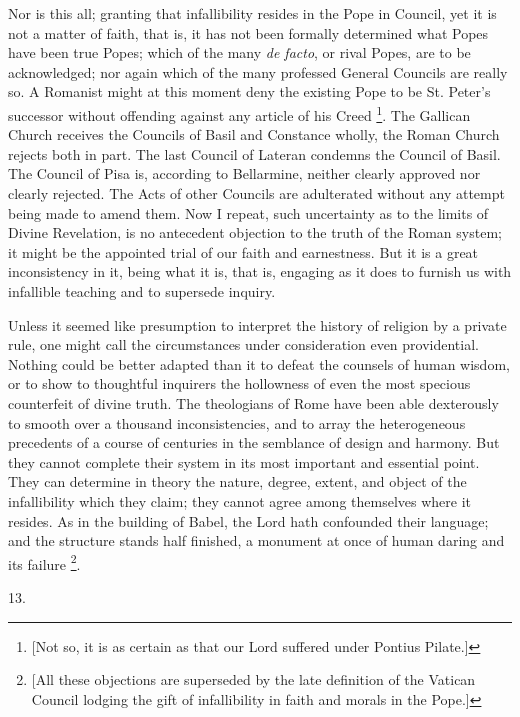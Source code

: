 Nor is this all; granting that infallibility resides in the Pope in
Council, yet it is not a matter of faith, that is, it has not
been formally determined what Popes have been true Popes; which of the
many \emph{de facto}, or rival Popes, are to be acknowledged; nor
again which of the many professed General Councils are really so. A
Romanist might at this moment deny the existing Pope to be St. Peter's
successor without offending against any article of his Creed \footnote{[Not so, it is as certain as that our Lord
suffered under Pontius Pilate.]}. The Gallican Church receives the Councils of Basil and
Constance wholly, the Roman Church rejects both in part. The last
Council of Lateran condemns the Council of Basil. The Council of Pisa
is, according to Bellarmine, neither clearly approved nor clearly
rejected. The Acts of other Councils are adulterated without any
attempt being made to amend them. Now I repeat, such uncertainty as to
the limits of Divine Revelation, is no antecedent objection to the
truth of the Roman system; it might be the appointed trial of our
faith and earnestness. But it is a great inconsistency in it, being
what it is, that is, engaging as it does to furnish us with infallible
teaching and to supersede inquiry.

Unless it seemed like presumption to interpret the history of
religion by a private rule, one might call the circumstances under
consideration even providential. Nothing could be better adapted than
it to defeat the counsels of human wisdom, or to show to thoughtful
inquirers the hollowness of even the most specious counterfeit of
divine truth. The theologians of Rome have been able dexterously to
smooth over a thousand inconsistencies, and to array the heterogeneous
precedents of a course of centuries in the semblance of design and
harmony. But they cannot complete their system in its most important
and essential point. They can determine in theory the nature, degree,
extent, and object of the infallibility which they claim; they cannot
agree among themselves where it resides. As in the building of
Babel, the Lord hath confounded their language; and the structure
stands half finished, a monument at once of human daring and its
failure \footnote{[All these objections are superseded by
the late definition of the Vatican Council lodging the gift of
infallibility in faith and morals in the Pope.]}.

13.

